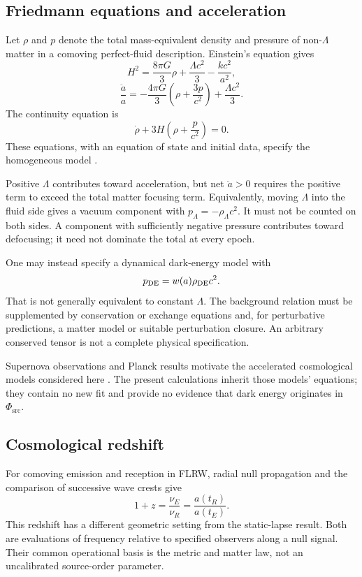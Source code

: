 \documentclass[11pt,oneside]{report}
\newcommand{\PhiSrc}{\Phi_{\mathrm{src}}}
\theoremstyle{remark}
\numberwithin{definition}{chapter}
\numberwithin{proposition}{chapter}
\numberwithin{remark}{chapter}
\begin{document}
\subsection{Friedmann equations and acceleration}
Let $\rho$ and $p$ denote the total mass-equivalent density and pressure of non-$\Lambda$ matter in a comoving perfect-fluid description. Einstein's equation gives
\begin{equation}
H^2=\frac{8\pi G}{3}\rho+\frac{\Lambda c^2}{3}-\frac{kc^2}{a^2},
\label{relativistic_recovery:eq:friedmann1}
\end{equation}
\begin{equation}
\frac{\ddot a}{a}=-\frac{4\pi G}{3}\left(\rho+\frac{3p}{c^2}\right)
+\frac{\Lambda c^2}{3}.
\label{relativistic_recovery:eq:friedmann2}
\end{equation}
The continuity equation is
\begin{equation}
\dot\rho+3H\left(\rho+\frac{p}{c^2}\right)=0.
\end{equation}
These equations, with an equation of state and initial data, specify the homogeneous model \parencite{EllisVanElst1999,Carroll1997}.

Positive $\Lambda$ contributes toward acceleration, but net $\ddot a>0$ requires the positive term to exceed the total matter focusing term. Equivalently, moving $\Lambda$ into the fluid side gives a vacuum component with $p_\Lambda=-\rho_\Lambda c^2$. It must not be counted on both sides. A component with sufficiently negative pressure contributes toward defocusing; it need not dominate the total at every epoch.

One may instead specify a dynamical dark-energy model with
\begin{equation}
p_{\rm DE}=w(a)\rho_{\rm DE}c^2.
\label{relativistic_recovery:eq:wa}
\end{equation}
That is not generally equivalent to constant $\Lambda$. The background relation must be supplemented by conservation or exchange equations and, for perturbative predictions, a matter model or suitable perturbation closure. An arbitrary conserved tensor is not a complete physical specification.

Supernova observations and Planck results motivate the accelerated cosmological models considered here \parencite{Riess1998,Perlmutter1999,Planck2018Parameters}. The present calculations inherit those models' equations; they contain no new fit and provide no evidence that dark energy originates in $\PhiSrc$.

\subsection{Cosmological redshift}
For comoving emission and reception in FLRW, radial null propagation and the comparison of successive wave crests give
\begin{equation}
1+z=\frac{\nu_E}{\nu_R}=\frac{a(t_R)}{a(t_E)}.
\end{equation}
This redshift has a different geometric setting from the static-lapse result. Both are evaluations of frequency relative to specified observers along a null signal. Their common operational basis is the metric and matter law, not an uncalibrated source-order parameter.
\end{document}
